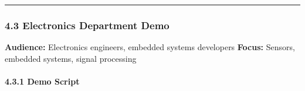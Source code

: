 \documentclass[
]{article}
\begin{document}
\begin{center}\rule{0.5\linewidth}{0.5pt}\end{center}

\hypertarget{electronics-department-demo}{%
\subsubsection{4.3 Electronics Department
Demo}\label{electronics-department-demo}}

\textbf{Audience:} Electronics engineers, embedded systems developers
\textbf{Focus:} Sensors, embedded systems, signal processing

\hypertarget{demo-script-2}{%
\paragraph{4.3.1 Demo Script}\label{demo-script-2}}
\end{document}
